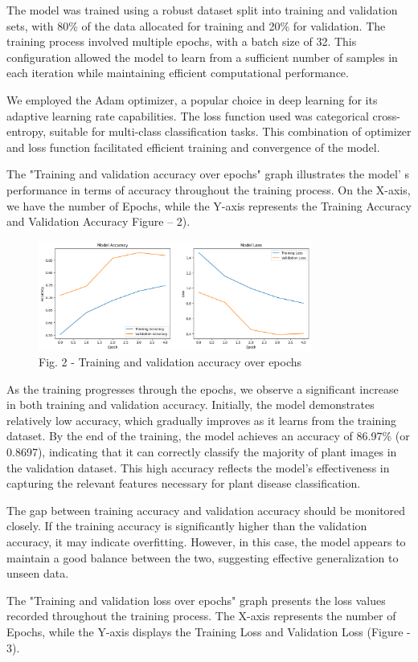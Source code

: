 \begin{multicols}{2}
The model was trained using a robust dataset split into training and
validation sets, with 80\% of the data allocated for training and 20\%
for validation. The training process involved multiple epochs, with a
batch size of 32. This configuration allowed the model to learn from a
sufficient number of samples in each iteration while maintaining
efficient computational performance.

We employed the Adam optimizer, a popular choice in deep learning for
its adaptive learning rate capabilities. The loss function used was
categorical cross-entropy, suitable for multi-class classification
tasks. This combination of optimizer and loss function facilitated
efficient training and convergence of the model.

The "Training and validation accuracy over epochs" graph illustrates the
model' s performance in terms of accuracy throughout the
training process. On the X-axis, we have the number of Epochs, while the
Y-axis represents the Training Accuracy and Validation Accuracy Figure
-- 2).
\end{multicols}

\begin{figure}[H]
	\centering
	\includegraphics[width=0.8\textwidth]{media/ict/image32}
	\caption*{Fig. 2 - Training and validation accuracy over epochs}
\end{figure}

\begin{multicols}{2}
As the training progresses through the epochs, we observe a significant
increase in both training and validation accuracy. Initially, the model
demonstrates relatively low accuracy, which gradually improves as it
learns from the training dataset. By the end of the training, the model
achieves an accuracy of 86.97\% (or 0.8697), indicating that it can
correctly classify the majority of plant images in the validation
dataset. This high accuracy reflects the model's effectiveness in
capturing the relevant features necessary for plant disease
classification.

The gap between training accuracy and validation accuracy should be
monitored closely. If the training accuracy is significantly higher than
the validation accuracy, it may indicate overfitting. However, in this
case, the model appears to maintain a good balance between the two,
suggesting effective generalization to unseen data.

The "Training and validation loss over epochs" graph presents the loss
values recorded throughout the training process. The X-axis represents
the number of Epochs, while the Y-axis displays the Training Loss and
Validation Loss (Figure - 3).
\end{multicols}

